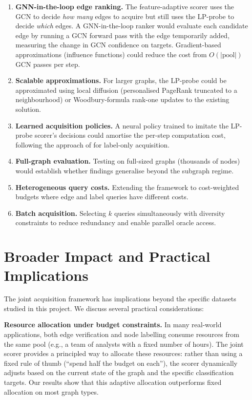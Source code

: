 \documentclass[12pt,a4paper,oneside]{report}
\begin{document}
\begin{enumerate}[leftmargin=2em]
    \item \textbf{GNN-in-the-loop edge ranking.} The feature-adaptive scorer uses the GCN to decide \emph{how many} edges to acquire but still uses the LP-probe to decide \emph{which} edges. A GNN-in-the-loop ranker would evaluate each candidate edge by running a GCN forward pass with the edge temporarily added, measuring the change in GCN confidence on targets. Gradient-based approximations (influence functions) could reduce the cost from $O(|\text{pool}|)$ GCN passes per step.

    \item \textbf{Scalable approximations.} For larger graphs, the LP-probe could be approximated using local diffusion (personalised PageRank truncated to a neighbourhood) or Woodbury-formula rank-one updates to the existing solution.

    \item \textbf{Learned acquisition policies.} A neural policy trained to imitate the LP-probe scorer's decisions could amortise the per-step computation cost, following the approach of \citet{gpa} for label-only acquisition.

    \item \textbf{Full-graph evaluation.} Testing on full-sized graphs (thousands of nodes) would establish whether findings generalise beyond the subgraph regime.

    \item \textbf{Heterogeneous query costs.} Extending the framework to cost-weighted budgets where edge and label queries have different costs.

    \item \textbf{Batch acquisition.} Selecting $k$ queries simultaneously with diversity constraints to reduce redundancy and enable parallel oracle access.
\end{enumerate}


\section{Broader Impact and Practical Implications}

The joint acquisition framework has implications beyond the specific datasets studied in this project. We discuss several practical considerations:

\textbf{Resource allocation under budget constraints.} In many real-world applications, both edge verification and node labelling consume resources from the same pool (e.g., a team of analysts with a fixed number of hours). The joint scorer provides a principled way to allocate these resources: rather than using a fixed rule of thumb (``spend half the budget on each''), the scorer dynamically adjusts based on the current state of the graph and the specific classification targets. Our results show that this adaptive allocation outperforms fixed allocation on most graph types.
\end{document}
